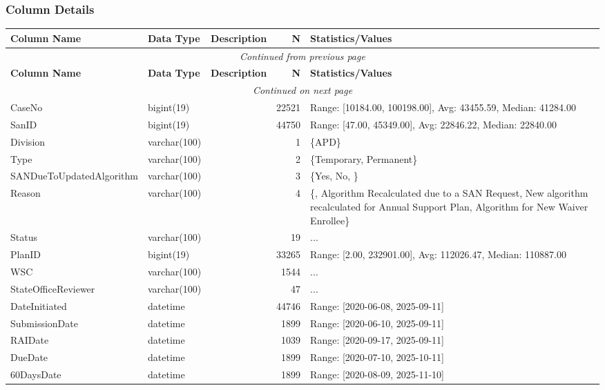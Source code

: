 \begin{landscape}
\subsubsection{Column Details}
\begin{longtable}{|l|l|l|r|p{6cm}|}
\hline
\textbf{Column Name} & \textbf{Data Type} & \textbf{Description} & \textbf{N} & \textbf{Statistics/Values} \\
\hline
\endfirsthead
\multicolumn{5}{c}{\textit{Continued from previous page}} \\
\hline
\textbf{Column Name} & \textbf{Data Type} & \textbf{Description} & \textbf{N} & \textbf{Statistics/Values} \\
\hline
\endhead
\hline
\multicolumn{5}{c}{\textit{Continued on next page}} \\
\endfoot
\hline
\endlastfoot
CaseNo & bigint(19) &  & 22521 & Range: [10184.00, 100198.00], Avg: 43455.59, Median: 41284.00 \\
\hline
SanID & bigint(19) &  & 44750 & Range: [47.00, 45349.00], Avg: 22846.22, Median: 22840.00 \\
\hline
Division & varchar(100) &  & 1 & \{APD\} \\
\hline
Type & varchar(100) &  & 2 & \{Temporary, Permanent\} \\
\hline
SANDueToUpdatedAlgorithm & varchar(100) &  & 3 & \{Yes, No, \} \\
\hline
Reason & varchar(100) &  & 4 & \{, Algorithm Recalculated due to a SAN Request, New algorithm recalculated for Annual Support Plan, Algorithm for New Waiver Enrollee\} \\
\hline
Status & varchar(100) &  & 19 & ... \\
\hline
PlanID & bigint(19) &  & 33265 & Range: [2.00, 232901.00], Avg: 112026.47, Median: 110887.00 \\
\hline
WSC & varchar(100) &  & 1544 & ... \\
\hline
StateOfficeReviewer & varchar(100) &  & 47 & ... \\
\hline
DateInitiated & datetime &  & 44746 & Range: [2020-06-08, 2025-09-11] \\
\hline
SubmissionDate & datetime &  & 1899 & Range: [2020-06-10, 2025-09-11] \\
\hline
RAIDate & datetime &  & 1039 & Range: [2020-09-17, 2025-09-11] \\
\hline
DueDate & datetime &  & 1899 & Range: [2020-07-10, 2025-10-11] \\
\hline
60DaysDate & datetime &  & 1899 & Range: [2020-08-09, 2025-11-10] \\

\end{longtable}
\end{landscape}
